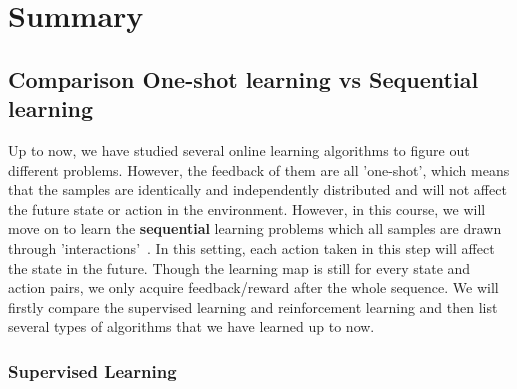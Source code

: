\documentclass[11pt]{article}
\begin{document}
\newpage

\section{Summary}

\subsection{Comparison One-shot learning vs Sequential learning}
Up to now, we have studied several online learning algorithms to figure out different problems. However, the feedback of them are all 'one-shot', which means that the samples are identically and independently distributed and will not affect the future state or action in the environment. However, in this course, we will move on to learn the \textbf{sequential} learning problems which all samples are drawn through 'interactions'~\cite{kaelbling1996reinforcement}. In this setting, each action taken in this step will affect the state in the future. Though the learning map is still for every state and action pairs, we only acquire feedback/reward after the whole sequence. We will firstly compare the supervised learning and reinforcement learning and then list several types of algorithms that we have learned up to now.



\subsubsection{Supervised Learning}
\end{document}
